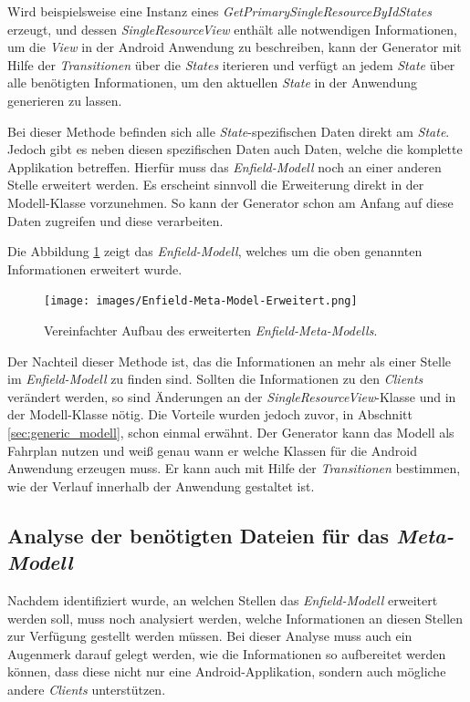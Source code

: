 Wird beispielsweise eine Instanz eines \textit{GetPrimarySingleResourceByIdStates} erzeugt, und dessen \textit{SingleResourceView} enthält alle notwendigen Informationen, um die \textit{View} in der Android Anwendung zu beschreiben, kann der Generator mit Hilfe der \textit{Transitionen} über die \textit{States} iterieren und verfügt an jedem \textit{State} über alle benötigten Informationen, um den aktuellen \textit{State} in der Anwendung generieren zu lassen.

Bei dieser Methode befinden sich alle \textit{State}-spezifischen Daten direkt am \textit{State}. Jedoch gibt es neben diesen spezifischen Daten auch Daten, welche die komplette Applikation betreffen. Hierfür muss das \textit{Enfield-Modell} noch an einer anderen Stelle erweitert werden. 
Es erscheint sinnvoll die Erweiterung direkt in der Modell-Klasse vorzunehmen. So kann der Generator schon am Anfang auf diese Daten zugreifen und diese verarbeiten.

Die Abbildung \ref{fig:enfield-model-extended} zeigt das \textit{Enfield-Modell}, welches um die oben genannten Informationen erweitert wurde.

\begin{figure}[H]
	\begin{center}
		\texttt{[image: images/Enfield-Meta-Model-Erweitert.png]}
		\caption{Vereinfachter Aufbau des erweiterten \textit{Enfield-Meta-Modells}.}
		\label{fig:enfield-model-extended}
	\end{center}
\end{figure}

Der Nachteil dieser Methode ist, das die Informationen an mehr als einer Stelle im \textit{Enfield-Modell} zu finden sind. Sollten die Informationen zu den \textit{Clients} verändert werden, so sind Änderungen an der \textit{SingleResourceView}-Klasse und in der Modell-Klasse nötig. Die Vorteile wurden jedoch zuvor, in Abschnitt \ref{sec:generic_modell}, schon einmal erwähnt. Der Generator kann das Modell als Fahrplan nutzen und weiß genau wann er welche Klassen für die Android Anwendung erzeugen muss. Er kann auch mit Hilfe der \textit{Transitionen} bestimmen, wie der Verlauf innerhalb der Anwendung gestaltet ist.

\subsection{Analyse der benötigten Dateien für das \textit{Meta-Modell}}

Nachdem identifiziert wurde, an welchen Stellen das \textit{Enfield-Modell} erweitert werden soll, muss noch analysiert werden, welche Informationen an diesen Stellen zur Verfügung gestellt werden müssen. Bei dieser Analyse muss auch ein Augenmerk darauf gelegt werden, wie die Informationen so aufbereitet werden können, dass diese nicht nur eine Android-Applikation, sondern auch mögliche andere \textit{Clients} unterstützen.

